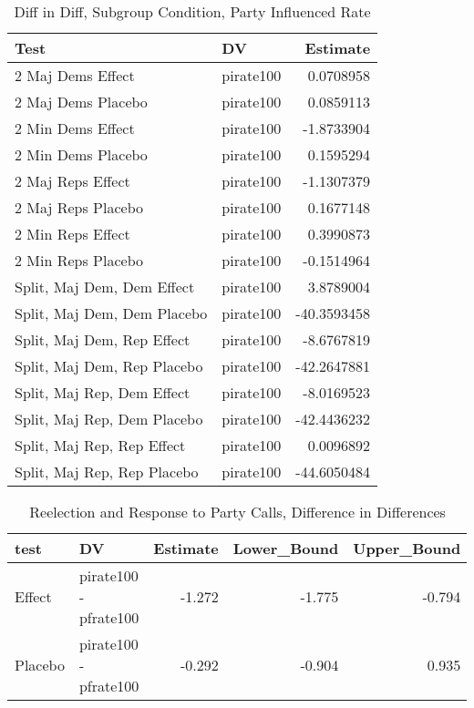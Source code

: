 \documentclass[12pt]{article}
\begin{document}
\begin{table}[H]
	\centering
	\caption{Diff in Diff, Subgroup Condition, Party Influenced Rate} 
	\begin{tabular}{llr}
		\hline
		Test & DV & Estimate \\ 
		\hline
		2 Maj Dems Effect & pirate100 & 0.0708958 \\ 
		2 Maj Dems Placebo & pirate100 & 0.0859113 \\ 
		2 Min Dems Effect & pirate100 & -1.8733904 \\ 
		2 Min Dems Placebo & pirate100 & 0.1595294 \\ 
		2 Maj Reps Effect & pirate100 & -1.1307379 \\ 
		2 Maj Reps Placebo & pirate100 & 0.1677148 \\ 
		2 Min Reps Effect & pirate100 & 0.3990873 \\ 
		2 Min Reps Placebo & pirate100 & -0.1514964 \\ 
		Split, Maj Dem, Dem Effect & pirate100 & 3.8789004 \\ 
		Split, Maj Dem, Dem Placebo & pirate100 & -40.3593458 \\ 
		Split, Maj Dem, Rep Effect & pirate100 & -8.6767819 \\ 
		Split, Maj Dem, Rep Placebo & pirate100 & -42.2647881 \\ 
		Split, Maj Rep, Dem Effect & pirate100 & -8.0169523 \\ 
		Split, Maj Rep, Dem Placebo & pirate100 & -42.4436232 \\ 
		Split, Maj Rep, Rep Effect & pirate100 & 0.0096892 \\ 
		Split, Maj Rep, Rep Placebo & pirate100 & -44.6050484 \\ 
		\hline
	\end{tabular}
\end{table}

\begin{table}[H]
	\centering
	\caption{Reelection and Response to Party Calls, Difference in Differences} 
	\begin{tabular}{llrrr}
		\hline
		test & DV & Estimate & Lower\_Bound & Upper\_Bound \\ 
		\hline
		Effect & pirate100 - pfrate100 & -1.272 & -1.775 & -0.794 \\ 
		Placebo & pirate100 - pfrate100 & -0.292 & -0.904 & 0.935 \\ 
		\hline
	\end{tabular}
\end{table}
\end{document}
